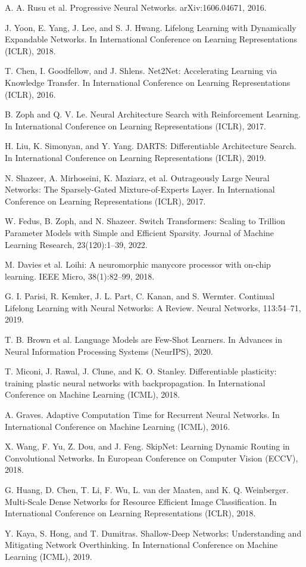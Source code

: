 \documentclass{article}
\numberwithin{figure}{section}
\numberwithin{table}{section}
\numberwithin{algorithm}{section}
\begin{document}
\begin{thebibliography}{99}
A. A. Rusu et al. Progressive Neural Networks. arXiv:1606.04671, 2016.

J. Yoon, E. Yang, J. Lee, and S. J. Hwang. Lifelong Learning with Dynamically Expandable Networks. In International Conference on Learning Representations (ICLR), 2018.

T. Chen, I. Goodfellow, and J. Shlens. Net2Net: Accelerating Learning via Knowledge Transfer. In International Conference on Learning Representations (ICLR), 2016.

B. Zoph and Q. V. Le. Neural Architecture Search with Reinforcement Learning. In International Conference on Learning Representations (ICLR), 2017.

H. Liu, K. Simonyan, and Y. Yang. DARTS: Differentiable Architecture Search. In International Conference on Learning Representations (ICLR), 2019.

N. Shazeer, A. Mirhoseini, K. Maziarz, et al. Outrageously Large Neural Networks: The Sparsely-Gated Mixture-of-Experts Layer. In International Conference on Learning Representations (ICLR), 2017.

W. Fedus, B. Zoph, and N. Shazeer. Switch Transformers: Scaling to Trillion Parameter Models with Simple and Efficient Sparsity. Journal of Machine Learning Research, 23(120):1--39, 2022.

M. Davies et al. Loihi: A neuromorphic manycore processor with on-chip learning. IEEE Micro, 38(1):82--99, 2018.

G. I. Parisi, R. Kemker, J. L. Part, C. Kanan, and S. Wermter. Continual Lifelong Learning with Neural Networks: A Review. Neural Networks, 113:54--71, 2019.

T. B. Brown et al. Language Models are Few-Shot Learners. In Advances in Neural Information Processing Systems (NeurIPS), 2020.

T. Miconi, J. Rawal, J. Clune, and K. O. Stanley. Differentiable plasticity: training plastic neural networks with backpropagation. In International Conference on Machine Learning (ICML), 2018.

A. Graves. Adaptive Computation Time for Recurrent Neural Networks. In International Conference on Machine Learning (ICML), 2016.

X. Wang, F. Yu, Z. Dou, and J. Feng. SkipNet: Learning Dynamic Routing in Convolutional Networks. In European Conference on Computer Vision (ECCV), 2018.

G. Huang, D. Chen, T. Li, F. Wu, L. van der Maaten, and K. Q. Weinberger. Multi-Scale Dense Networks for Resource Efficient Image Classification. In International Conference on Learning Representations (ICLR), 2018.

Y. Kaya, S. Hong, and T. Dumitras. Shallow-Deep Networks: Understanding and Mitigating Network Overthinking. In International Conference on Machine Learning (ICML), 2019.

\end{thebibliography}
\end{document}
